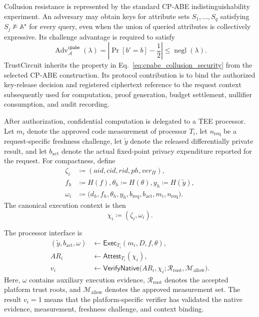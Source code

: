 \documentclass[10pt,journal,compsoc]{IEEEtran}
\begin{document}
Collusion resistance is represented by the standard CP-ABE indistinguishability experiment. An adversary may obtain keys for attribute sets $S_1,\ldots,S_q$ satisfying $S_j\not\models\mathbb{A}^{\star}$ for every query, even when the union of queried attributes is collectively expressive. Its challenge advantage is required to satisfy
\begin{equation}
\operatorname{Adv}^{\mathsf{cpabe}}_{\mathcal{A}}(\lambda)
=
\left|
\Pr[b'=b]-\frac{1}{2}
\right|
\leq
\operatorname{negl}(\lambda).
\label{eq:cpabe_collusion_security}
\end{equation}
TrustCircuit inherits the property in Eq.~\eqref{eq:cpabe_collusion_security} from the selected CP-ABE construction. Its protocol contribution is to bind the authorized key-release decision and registered ciphertext reference to the request context subsequently used for computation, proof generation, budget settlement, nullifier consumption, and audit recording.

After authorization, confidential computation is delegated to a TEE processor. Let $m_i$ denote the approved code measurement of processor $T_i$, let $n_{\mathrm{req}}$ be a request-specific freshness challenge, let $\widetilde{y}$ denote the released differentially private result, and let $b_{\mathrm{act}}$ denote the actual fixed-point privacy expenditure reported for the request. For compactness, define
\begin{equation}
\begin{aligned}
\zeta_i
&\coloneqq
(aid,cid,rid,ph,ver_{\Pi}),\\
f_h&\coloneqq H(f),
\theta_h\coloneqq H(\theta),
y_h\coloneqq H(\widetilde{y}),\\
\omega_i
&\coloneqq
\bigl(
d_h,f_h,\theta_h,y_h,
b_{\mathrm{req}},b_{\mathrm{act}},m_i,n_{\mathrm{req}}
\bigr).
\end{aligned}
\end{equation}
The canonical execution context is then
\begin{equation}
\chi_i\coloneqq(\zeta_i,\omega_i).
\label{eq:canonical_attestation_context}
\end{equation}

The processor interface is
\begin{equation}
\begin{aligned}
(\widetilde{y},b_{\mathrm{act}},\omega) &\leftarrow \mathsf{Exec}_{T_i} (m_i,D,f,\theta),\\
AR_i &\leftarrow \mathsf{Attest}_{T_i} (\chi_i),\\
v_i &\leftarrow\mathsf{VerifyNative} \bigl (AR_i,\chi_i; \mathcal{R}_{\mathrm{root}},\mathcal{M}_{\mathrm{allow}} \bigr).
\end{aligned}
\label{eq:tee_attestation_interface}
\end{equation}
Here, $\omega$ contains auxiliary execution evidence, $\mathcal{R}_{\mathrm{root}}$ denotes the accepted platform trust roots, and $\mathcal{M}_{\mathrm{allow}}$ denotes the approved measurement set. The result $v_i=1$ means that the platform-specific verifier has validated the native evidence, measurement, freshness challenge, and context binding.
\end{document}
